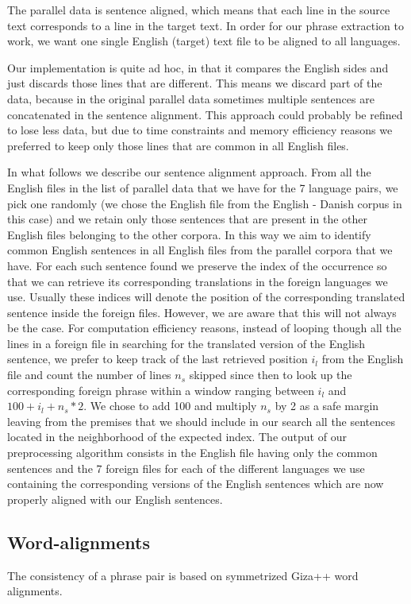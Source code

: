 \documentclass[11pt]{article}
\begin{document}
The parallel data is sentence aligned, which means that each line in the source text corresponds to a line in the target text.
In order for our phrase extraction to work, we want one single English (target) text file to be aligned to all languages.

Our implementation is quite ad hoc, in that it compares the English sides and just discards those lines that are different. This means we discard part of the data, because in the original parallel data sometimes multiple sentences are concatenated in the sentence alignment. This approach could probably be refined to lose less data, but due to time constraints and memory efficiency reasons we preferred to keep only those lines that are common in all English files. 

In what follows we describe our sentence alignment approach. From all the English files in the list of parallel data that we have for the 7 language pairs, we pick one randomly (we chose the English file from the English - Danish corpus in this case) and we retain only those sentences that are present in the other English files belonging to the other corpora. In this way we aim to identify common English sentences in all English files from the parallel corpora that we have. For each such sentence found we preserve the index of the occurrence so that we can retrieve its corresponding translations in the foreign languages we use. Usually these indices will denote the position of the corresponding translated sentence inside the foreign files. However, we are aware that this will not always be the case. For computation efficiency reasons, instead of looping though all the lines in a foreign file in searching for the translated version of the English sentence, we prefer to keep track of the last retrieved position $i_l$ from the English file and count the number of lines $n_s$ skipped since then to look up the corresponding foreign phrase within a window ranging between $i_l$ and $100 + i_l + n_s*2$. We chose to add 100 and multiply $n_s$ by 2 as a safe margin leaving from the premises that we should include in our search all the sentences located in the neighborhood of the expected index. 
The output of our preprocessing algorithm consists in the English file having only the common sentences and the 7 foreign files for each of the different languages we use containing the corresponding versions of the English sentences which are now properly aligned with our English sentences. 

\subsection{Word-alignments}
 The consistency of a phrase pair is based on symmetrized Giza++ word alignments.
\end{document}
